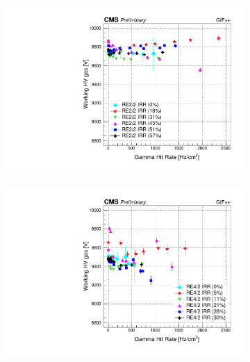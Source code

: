 	\begin{figure}[H]
    	\begin{subfigure}{0.5\linewidth}
			\centering
    		\includegraphics[width = \linewidth]{fig/chapt5/RE2-2_IRR_HVgas_vs_Rate.pdf}
        	\caption{\label{fig:GIFpp_hvgas_vs_rate:A}}
    	\end{subfigure}
    	\begin{subfigure}{0.5\linewidth}
			\centering
    		\includegraphics[width = \linewidth]{fig/chapt5/RE4-2_IRR_HVgas_vs_Rate.pdf}
        	\caption{\label{fig:GIFpp_hvgas_vs_rate:B}}
    	\end{subfigure}
    	\begin{subfigure}{0.5\linewidth}
			\centering

\end{subfigure}
\end{figure}
